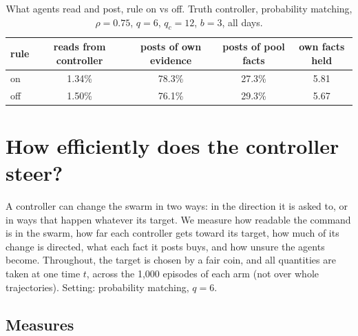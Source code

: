 \documentclass[10pt,a4paper]{article}
\begin{document}
\begin{table}[H]
\centering\small
\caption{What agents read and post, rule on vs off. Truth controller, probability
matching, $\rho = 0.75$, $q = 6$, $q_c = 12$, $b = 3$, all days.}
\label{tab:sub}
\begin{tabular}{lcccc}
\toprule
rule & reads from controller & posts of own evidence & posts of pool facts & own facts held \\
\midrule
on & 1.34\% & 78.3\% & 27.3\% & 5.81 \\
off & 1.50\% & 76.1\% & 29.3\% & 5.67 \\
\bottomrule
\end{tabular}
\end{table}


\section{How efficiently does the controller steer?}\label{sec:eff}

A controller can change the swarm in two ways: in the direction it is asked to, or in ways that
happen whatever its target. We measure how readable the command is in the swarm, how far each
controller gets toward its target, how much of its change is directed, what each fact it posts buys,
and how unsure the agents become. Throughout, the target is chosen by a fair coin, and all
quantities are taken at one time $t$, across the 1{,}000 episodes of each arm (not over whole
trajectories). Setting: probability matching, $q = 6$.

\subsection{Measures}
\end{document}
